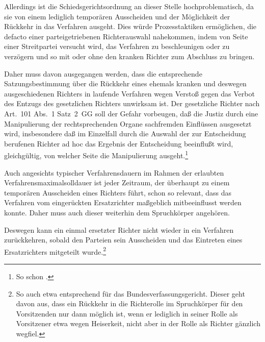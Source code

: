 Allerdings ist die Schiedsgerichtsordnung an dieser Stelle hochproblematisch, da sie von einem lediglich temporären Ausscheiden und der Möglichkeit der Rückkehr in das Verfahren ausgeht.
Dies würde Prozesstaktiken ermöglichen, die defacto einer parteigetriebenen Richterauswahl nahekommen, indem von Seite einer Streitpartei versucht wird, das Verfahren zu beschleunigen oder zu verzögern und so mit oder ohne den kranken Richter zum Abschluss zu bringen. 

Daher muss davon ausgegangen werden, dass die entsprechende Satzungsbestimmung über die Rückkehr eines ehemals kranken und deswegen ausgeschiedenen Richters in laufende Verfahren wegen Verstoß gegen das Verbot des Entzugs des gesetzlichen Richters unwirksam ist. Der gesetzliche Richter nach Art.~101 Abs.~1 Satz~2~GG soll der Gefahr vorbeugen, daß die Justiz durch eine Manipulierung der rechtsprechenden Organe sachfremden Einflüssen ausgesetzt wird, insbesondere daß im Einzelfall durch die Auswahl der zur Entscheidung berufenen Richter ad hoc das Ergebnis der Entscheidung beeinflußt wird, gleichgültig, von welcher Seite die Manipulierung ausgeht.\footnote{So schon \cite[299]{BVerfGE17294}.}

Auch angesichts typischer Verfahrensdauern im Rahmen der erlaubten Verfahrensmaximalsolldauer ist jeder Zeitraum, der überhaupt zu einem temporären Ausscheiden eines Richters führt, schon so relevant, dass das Verfahren vom eingerückten Ersatzrichter maßgeblich mitbeeinflusst werden konnte.
Daher muss auch dieser weiterhin dem Spruchkörper angehören.

Deswegen kann ein einmal ersetzter Richter nicht wieder in ein Verfahren zurückkehren, sobald den Parteien sein Ausscheiden und das Eintreten eines Ersatzrichters mitgeteilt wurde.\footnote{So auch etwa \cite[Eschelbach][\S~15 Rn~31]{BVerfGGMitarbeiterKommentar} entsprechend für das Bundesverfassungsgericht. Dieser geht davon aus, dass ein Rückkehr in die Richterolle im Spruchkörper für den Vorsitzenden nur dann möglich ist, wenn er lediglich in seiner Rolle als Vorsitzener etwa wegen Heiserkeit, nicht aber in der Rolle als Richter gänzlich wegfiel.}

